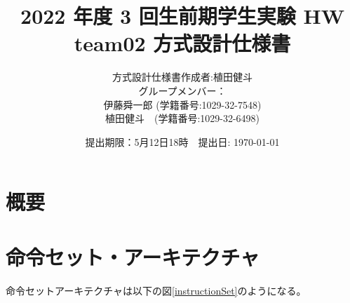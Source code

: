 \documentclass[a4j,titlepage]{jarticle}
\begin{document}
\title{2022 年度 3 回生前期学生実験 HW  \\ \bf team02 方式設計仕様書}
\author{方式設計仕様書作成者:植田健斗\\
グループメンバー：\\伊藤舜一郎 (学籍番号:1029-32-7548)
\\植田健斗　(学籍番号:1029-32-6498)}
\date{提出期限：5月12日18時　提出日: \today} %
\maketitle
\newpage

\section{概要}

\section{命令セット・アーキテクチャ}
命令セットアーキテクチャは以下の図\ref{instructionSet}のようになる。
\end{document}
